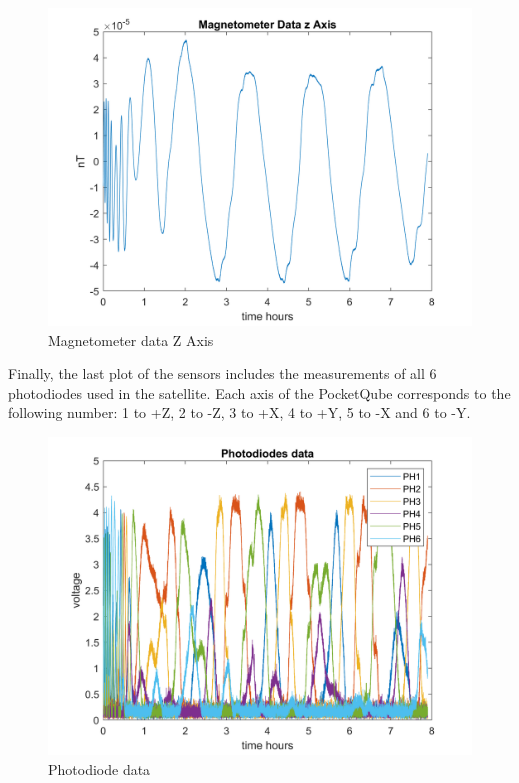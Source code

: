 \begin{itemize}
\begin{figure}[H]
\begin{minipage}{0.32\linewidth}
        \end{minipage}\hfill
        \begin{minipage}{0.32\linewidth}
            \centering
            \includegraphics[width=0.95\linewidth]{res/img/Nadir_no_EKF/Magnetometer data Z Axis.png}
            \caption{Magnetometer data Z Axis}
            \label{fig:MagnetometerDataZ}
        \end{minipage}
    \end{figure}

    Finally, the last plot of the sensors includes the measurements of all 6 photodiodes used in the satellite. 
    Each axis of the PocketQube corresponds to the following number: 1 to +Z, 2 to -Z, 3 to +X, 4 to +Y,
    5 to -X and 6 to -Y.
    \begin{figure}[H]
        \centering
        \includegraphics[width=0.7\linewidth]{res/img/Nadir_no_EKF/Photodiode data.png}
        \caption{Photodiode data}
        \label{fig:PhotodiodeData}
    \end{figure}


\end{itemize}
